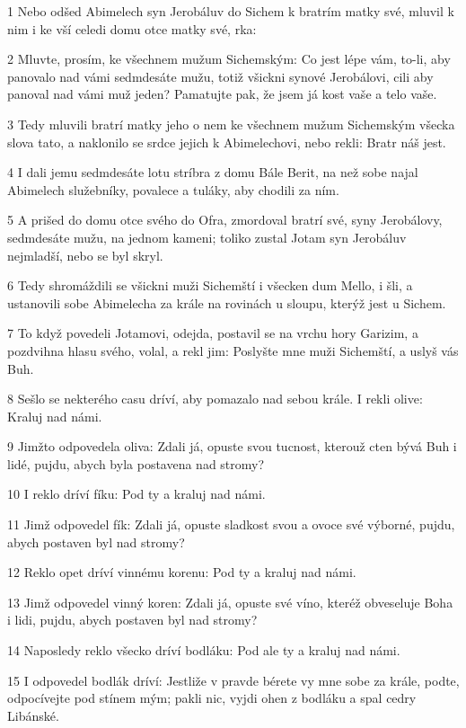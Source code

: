 \par 1 Nebo odšed Abimelech syn Jerobáluv do Sichem k bratrím matky své, mluvil k nim i ke vší celedi domu otce matky své, rka:
\par 2 Mluvte, prosím, ke všechnem mužum Sichemským: Co jest lépe vám, to-li, aby panovalo nad vámi sedmdesáte mužu, totiž všickni synové Jerobálovi, cili aby panoval nad vámi muž jeden? Pamatujte pak, že jsem já kost vaše a telo vaše.
\par 3 Tedy mluvili bratrí matky jeho o nem ke všechnem mužum Sichemským všecka slova tato, a naklonilo se srdce jejich k Abimelechovi, nebo rekli: Bratr náš jest.
\par 4 I dali jemu sedmdesáte lotu stríbra z domu Bále Berit, na než sobe najal Abimelech služebníky, povalece a tuláky, aby chodili za ním.
\par 5 A prišed do domu otce svého do Ofra, zmordoval bratrí své, syny Jerobálovy, sedmdesáte mužu, na jednom kameni; toliko zustal Jotam syn Jerobáluv nejmladší, nebo se byl skryl.
\par 6 Tedy shromáždili se všickni muži Sichemští i všecken dum Mello, i šli, a ustanovili sobe Abimelecha za krále na rovinách u sloupu, kterýž jest u Sichem.
\par 7 To když povedeli Jotamovi, odejda, postavil se na vrchu hory Garizim, a pozdvihna hlasu svého, volal, a rekl jim: Poslyšte mne muži Sichemští, a uslyš vás Buh.
\par 8 Sešlo se nekterého casu dríví, aby pomazalo nad sebou krále. I rekli olive: Kraluj nad námi.
\par 9 Jimžto odpovedela oliva: Zdali já, opuste svou tucnost, kterouž cten bývá Buh i lidé, pujdu, abych byla postavena nad stromy?
\par 10 I reklo dríví fíku: Pod ty a kraluj nad námi.
\par 11 Jimž odpovedel fík: Zdali já, opuste sladkost svou a ovoce své výborné, pujdu, abych postaven byl nad stromy?
\par 12 Reklo opet dríví vinnému korenu: Pod ty a kraluj nad námi.
\par 13 Jimž odpovedel vinný koren: Zdali já, opuste své víno, kteréž obveseluje Boha i lidi, pujdu, abych postaven byl nad stromy?
\par 14 Naposledy reklo všecko dríví bodláku: Pod ale ty a kraluj nad námi.
\par 15 I odpovedel bodlák dríví: Jestliže v pravde bérete vy mne sobe za krále, podte, odpocívejte pod stínem mým; pakli nic, vyjdi ohen z bodláku a spal cedry Libánské.
